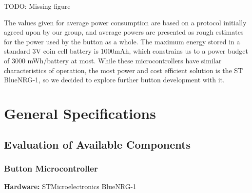 \documentclass[journal,compsoc]{IEEEtran}
\begin{document}
TODO: Missing figure

\noindent The values given for average power consumption are based on a protocol initially agreed upon by our group, and average powers are presented as rough estimates for the power used by the button as a whole.  The maximum energy stored in a standard 3V coin cell battery is 1000mAh, which constrains us to a power budget of 3000 mWh/battery at most.  While these microcontrollers have similar characteristics of operation, the most power and cost efficient solution is the ST BlueNRG-1, so we decided to explore further button development with it.

\section{General Specifications}

\subsection{Evaluation of Available Components}

\subsubsection{Button Microcontroller}

\textbf {Hardware:} STMicroelectronics BlueNRG-1
\end{document}
